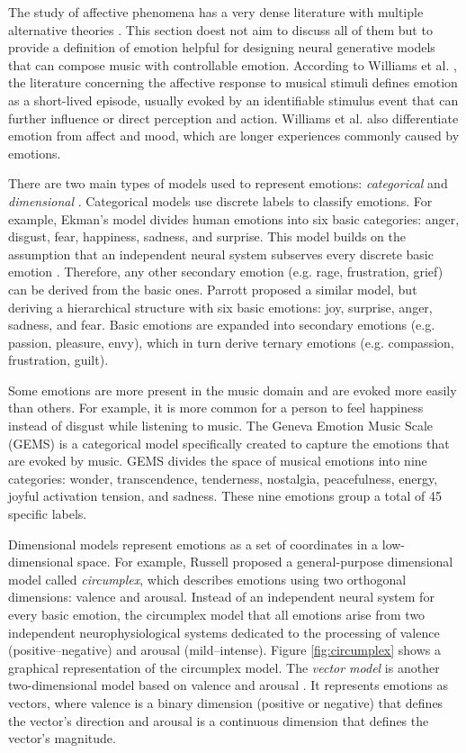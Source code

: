 The study of affective phenomena has a very dense literature with multiple alternative theories \cite{ekkekakis2013measurement}. This section doest not aim to discuss all of them but to provide a definition of emotion helpful for designing neural generative models that can compose music with controllable emotion.  According to Williams et al. \cite{williams2015investigating}, the literature concerning the affective response to musical stimuli defines emotion as a short-lived episode, usually evoked by an identifiable stimulus event that can further influence or direct perception and action. Williams et al. \cite{williams2015investigating} also differentiate emotion from affect and mood, which are longer experiences commonly caused by emotions.

There are two main types of models used to represent emotions: \emph{categorical} and \emph{dimensional} \cite{eerola2011comparison}. Categorical models use discrete labels to classify emotions. For example, Ekman's model \cite{ekman1992argument} divides human emotions into six basic categories: anger, disgust, fear, happiness, sadness, and surprise. This model builds on the assumption that an independent neural system subserves every discrete basic emotion \cite{eerola2011comparison}. Therefore, any other secondary emotion (e.g. rage, frustration, grief) can be derived from the basic ones. Parrott \cite{parrott2001emotions} proposed a similar model, but deriving a hierarchical structure with six basic emotions: joy, surprise, anger, sadness, and fear. Basic emotions are expanded into secondary emotions (e.g. passion, pleasure, envy), which in turn derive ternary emotions (e.g. compassion, frustration, guilt).

Some emotions are more present in the music domain and are evoked more easily than others. For example, it is more common for a person to feel happiness instead of disgust while listening to music. The Geneva Emotion Music Scale (GEMS) \cite{zentner2008emotions} is a categorical model specifically created to capture the emotions that are evoked by music. GEMS divides the space of musical emotions into nine categories: wonder, transcendence, tenderness, nostalgia, peacefulness, energy, joyful activation tension, and sadness. These nine emotions group a total of 45 specific labels.

Dimensional models represent emotions as a set of coordinates in a low-dimensional space. For example, Russell \cite{russell1980circumplex} proposed a general-purpose dimensional model called \textit{circumplex}, which describes emotions using two orthogonal dimensions: valence and arousal. Instead of an independent neural system for every basic emotion, the circumplex model that all emotions arise from two independent neurophysiological systems dedicated to the processing of valence (positive--negative) and arousal (mild--intense). Figure \ref{fig:circumplex} shows a graphical representation of the circumplex model. The \textit{vector model} is another two-dimensional model based on valence and arousal \cite{bradley1992remembering}. It represents emotions as vectors, where valence is a binary dimension (positive or negative) that defines the vector's direction and arousal is a continuous dimension that defines the vector's magnitude.

